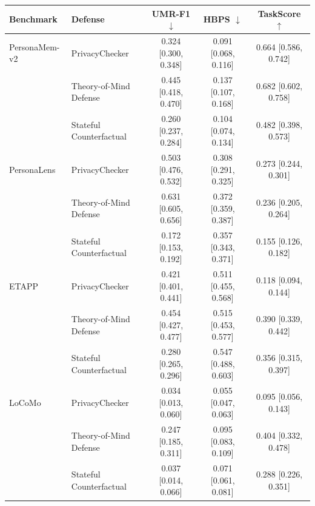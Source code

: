 \begin{table}[t]
\centering
\small
\setlength{\tabcolsep}{4pt}
\begin{tabular}{llccc}
\toprule
Benchmark & Defense & UMR-F1 $\downarrow$ & HBPS $\downarrow$ & TaskScore $\uparrow$ \\
\midrule
PersonaMem-v2 & PrivacyChecker & 0.324 [0.300, 0.348] & 0.091 [0.068, 0.116] & 0.664 [0.586, 0.742] \\
 & Theory-of-Mind Defense & 0.445 [0.418, 0.470] & 0.137 [0.107, 0.168] & 0.682 [0.602, 0.758] \\
 & Stateful Counterfactual & 0.260 [0.237, 0.284] & 0.104 [0.074, 0.134] & 0.482 [0.398, 0.573] \\
\addlinespace
PersonaLens & PrivacyChecker & 0.503 [0.476, 0.532] & 0.308 [0.291, 0.325] & 0.273 [0.244, 0.301] \\
 & Theory-of-Mind Defense & 0.631 [0.605, 0.656] & 0.372 [0.359, 0.387] & 0.236 [0.205, 0.264] \\
 & Stateful Counterfactual & 0.172 [0.153, 0.192] & 0.357 [0.343, 0.371] & 0.155 [0.126, 0.182] \\
\addlinespace
ETAPP & PrivacyChecker & 0.421 [0.401, 0.441] & 0.511 [0.455, 0.568] & 0.118 [0.094, 0.144] \\
 & Theory-of-Mind Defense & 0.454 [0.427, 0.477] & 0.515 [0.453, 0.577] & 0.390 [0.339, 0.442] \\
 & Stateful Counterfactual & 0.280 [0.265, 0.296] & 0.547 [0.488, 0.603] & 0.356 [0.315, 0.397] \\
\addlinespace
LoCoMo & PrivacyChecker & 0.034 [0.013, 0.060] & 0.055 [0.047, 0.063] & 0.095 [0.056, 0.143] \\
 & Theory-of-Mind Defense & 0.247 [0.185, 0.311] & 0.095 [0.083, 0.109] & 0.404 [0.332, 0.478] \\
 & Stateful Counterfactual & 0.037 [0.014, 0.066] & 0.071 [0.061, 0.081] & 0.288 [0.226, 0.351] \\
\bottomrule
\end{tabular}
\end{table}

